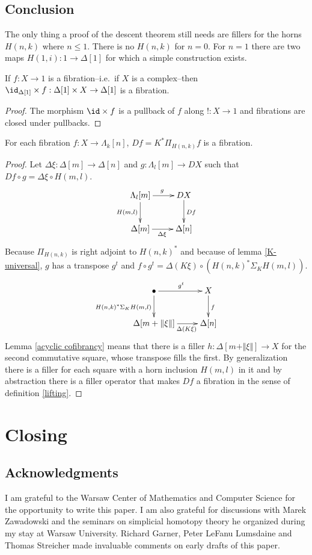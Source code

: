 \documentclass{tac}
\newcommand\ri{^*}
\newcommand\bang{!}
\newcommand\of{:}
\newcommand\simplex\Delta
\newcommand\horn\Lambda
\newcommand\norm[1]{\Vert #1 \Vert}
\newcommand\depprod{\Pi_}
\newcommand\depsum{\Sigma_}
\begin{document}
\subsection{Conclusion}
The only thing a proof of the descent theorem still needs are fillers for the horns $H(n,k)$ where $n\leq 1$. There is no $H(n,k)$ for $n=0$. For $n=1$ there are two maps $H(1,i)\of 1\to \simplex[1]$ for which a simple construction exists.

\begin{lemma} If $f\of X\to 1$ is a fibration--i.e.\ if $X$ is a complex--then $\id_{\simplex[1]}\times f\of\simplex[1]\times X\to \simplex[1]$ is a fibration. \end{lemma}

\begin{proof} The morphism $\id\times f$ is a pullback of $f$ along $\bang\of X\to 1$ and fibrations are closed under pullbacks. \end{proof}

\begin{theorem} For each fibration $f\of X\to\horn_k[n]$, $Df=K\ri\depprod{H(n,k)}f$ is a fibration. \label{descent} \end{theorem}


\begin{proof} Let $\simplex\xi\of \simplex[m]\to\simplex[n]$ and $g\of \horn_l[m]\to DX$ such that $Df\circ g = \simplex\xi\circ H(m,l)$. 
\[
	\xymatrix{
		\horn_l[m]\ar[r]^g\ar[d]_{H(m,l)} & DX\ar[d]^{Df} \\
		\simplex[m]\ar[r]_{\simplex\xi} & \simplex[n]
	}	
\]
Because $\depprod{H(n,k)}$ is right adjoint to $H(n,k)\ri$ and because of lemma \ref{K-universal}, $g$ has a transpose $g^t$ and $f\circ g^t = \simplex(K\xi)\circ (H(n,k)\ri \depsum{K} H(m,l))$.
\[
	\xymatrix{
		\bullet\ar[r]^{g^t}\ar[d]_{H(n,k)\ri \depsum K H(m,l)} & X\ar[d]^{f} \\
		\simplex[m+\norm\xi]\ar[r]_(.6){\simplex(K\xi)} & \simplex[n]
	}	
\]
Lemma \ref{acyclic cofibrancy} means that there is a filler $h\of \simplex[m+\norm\xi]\to X$ for the second commutative square, whose transpose fills the first.
By generalization there is a filler for each square with a horn inclusion $H(m,l)$ in it and by abstraction there is a filler operator that makes $Df$ a fibration in the sense of definition \ref{lifting}.
\end{proof}

\section{Closing}

\subsection*{Acknowledgments} 
I am grateful to the Warsaw Center of Mathematics and Computer Science for the opportunity to write this paper. I am also grateful for discussions with Marek Zawadowski and the seminars on simplicial homotopy theory he organized during my stay at Warsaw University. Richard Garner, Peter LeFanu Lumsdaine and Thomas Streicher made invaluable comments on early drafts of this paper.



\printbibliography
\end{document}
